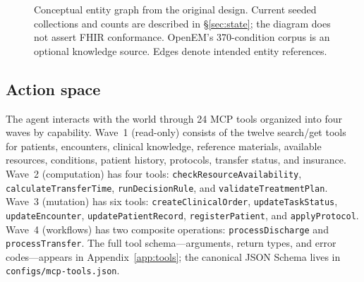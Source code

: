 \begin{figure}[t]
\centering
{}
\caption{Conceptual entity graph from the original design. Current seeded
collections and counts are described in \S\ref{sec:state}; the diagram
does not assert FHIR conformance. OpenEM's 370-condition corpus is an
optional knowledge source. Edges denote intended entity references.}
\label{fig:entity-graph}
\end{figure}

\subsection{Action space}
\label{sec:actions}
The agent interacts with the world through 24 MCP tools  %
organized into four waves  %
by capability. Wave~1 (read-only) consists of the twelve
search/get tools for patients, encounters, clinical knowledge,
reference materials, available resources, conditions, patient history,
protocols, transfer status, and insurance. Wave~2 (computation) has
four tools: \texttt{checkResourceAvailability},
\texttt{calculateTransferTime}, \texttt{runDecisionRule}, and
\texttt{validateTreatmentPlan}. Wave~3 (mutation) has six tools:
\texttt{createClinicalOrder}, \texttt{updateTaskStatus},
\texttt{updateEncounter}, \texttt{updatePatientRecord},
\texttt{registerPatient}, and \texttt{applyProtocol}. Wave~4
(workflows) has two composite operations: \texttt{processDischarge}
and \texttt{processTransfer}. The full tool schema---arguments,
return types, and error codes---appears in
Appendix~\ref{app:tools}; the canonical JSON Schema lives in
\texttt{configs/mcp-tools.json}.

